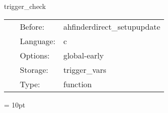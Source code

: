 \vspace{5mm}


\hspace{5mm} trigger\_check 

\hspace{5mm}{\it test } 


\hspace{5mm}

 \begin{tabular*}{160mm}{cll} 
~ & Before:  & ahfinderdirect\_setupupdate \\ 
~ & Language:  & c \\ 
~ & Options:  & global-early \\ 
~ & Storage:  & trigger\_vars \\ 
~ & Type:  & function \\ 
\end{tabular*} 



\vspace{5mm}\parskip = 10pt 

